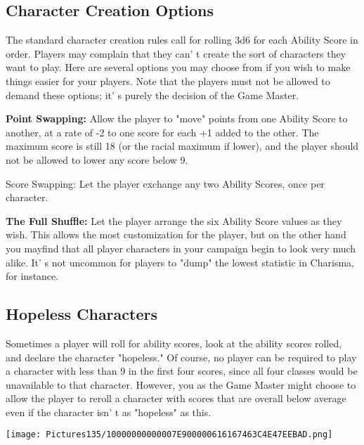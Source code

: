\documentclass[a4paper,twoside,openany,10pt]{book}
\begin{document}
\begin{multicols}{2}


\subsection{Character Creation Options}\label{character-creation-options}

The standard character creation rules call for rolling 3d6 for each Ability Score in order. Players may complain that they can' t create the sort of characters they want to play. Here are several options you may choose from if you wish to make things easier for your players. Note that the players must not be allowed to demand these options; it' s purely the decision of the Game Master.

\textbf{Point Swapping:} Allow the player to "move" points from one Ability Score to another, at a rate of -2 to one score for each +1 added to the other. The maximum score is still 18 (or the racial maximum if lower), and the player should not be allowed to lower any score below 9. 

Score Swapping: Let the player exchange any two Ability Scores, once per character.

\textbf{The Full Shuffle:} Let the player arrange the six Ability Score values as they wish. This allows the most customization for the player, but on the other hand you mayfind that all player characters in your  campaign begin to look very much alike. It' s not uncommon for players to "dump" the lowest statistic in Charisma, for instance.

\subsection{Hopeless Characters}\label{hopeless-characters}

Sometimes a player will roll for ability scores, look at the ability scores rolled, and declare the character "hopeless." Of course, no player can be required to play a character with less than 9 in the first four scores, since all four classes would be unavailable to that character. However, you as the Game Master might choose to allow the player to reroll a character with scores that are overall below average even if the character isn' t as "hopeless" as this.

\begin{center}

\texttt{[image: Pictures135/10000000000007E900000616167463C4E47EEBAD.png]}  
\end{center}


\end{multicols}
\end{document}
